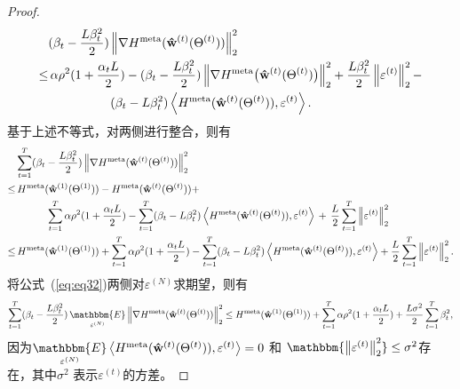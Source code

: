 \begin{proof}
\begin{equation}
\begin{aligned}
        & (\beta_t - \frac{L \beta_t^2}{2}) \left\| \nabla H^{\rm meta}(\mathbf{\hat w}^{(t)}(\Theta^{(t)})) \right\|_2^2  \\
        \leq & \, \alpha \rho^2 (1 + \frac{\alpha_t L}{2}) - (\beta_t - \frac{L \beta_t^2}{2}) \left\| \nabla H^{\rm meta} \big{(} \mathbf{\hat w}^{(t)}(\Theta^{(t)}) \big{)} \right\|_2^2 +  \frac{L \beta_t^2}{2} \left\| \varepsilon^{(t)} \right\|_2^2 - \\ &  \quad\quad\quad\quad\quad(\beta_t - L\beta_t^2) \left\langle H^{\rm meta}(\mathbf{\hat w}^{(t)}(\Theta^{(t)})), \varepsilon^{(t)}  \right\rangle. 
    \end{aligned}
\end{equation}
基于上述不等式，对两侧进行整合，则有
\begin{equation}
    \begin{aligned}
    \label{eq:eq32}
        &  \sum\limits_{t=1}^T (\beta_t - \frac{L \beta_t^2}{2}) \left\| \nabla H^{\rm meta}(\mathbf{\hat w}^{(t)}(\Theta^{(t)})) \right\|_2^2
        \\
        \leq & \, H^{\rm meta}(\mathbf{\hat w}^{(1)}(\Theta^{(1)})) 
        - 
        H^{\rm meta}(\mathbf{\hat w}^{(t)}(\Theta^{(t)}))  + \\
        & \quad \quad \quad \sum\limits_{t=1}^T \alpha \rho^2 (1 + \frac{\alpha_t L}{2}) -
        \sum\limits_{t=1}^T (\beta_t - L\beta_t^2) \left\langle H^{\rm meta}(\mathbf{\hat w}^{(t)}(\Theta^{(t)})), \varepsilon^{(t)}  \right\rangle 
        \, + \,
        \frac{L}{2} \sum\limits_{t=1}^T \left\| \varepsilon^{(t)} \right\|_2^2 \\
        \leq & \, H^{\rm meta}(\mathbf{\hat w}^{(1)}(\Theta^{(1)}))  + \sum\limits_{t=1}^T \alpha \rho^2 (1 + \frac{\alpha_t L}{2}) -
        \sum\limits_{t=1}^T (\beta_t - L\beta_t^2) \left\langle H^{\rm meta}(\mathbf{\hat w}^{(t)}(\Theta^{(t)})), \varepsilon^{(t)}  \right\rangle 
        +
        \frac{L}{2} \sum\limits_{t=1}^T \left\| \varepsilon^{(t)} \right\|_2^2.
    \end{aligned}
\end{equation}
将公式~(\ref{eq:eq32})两侧对$\varepsilon^{(N)}$求期望，则有
\begin{equation}
    \begin{aligned}
 \sum\limits_{t=1}^T (\beta_t - \frac{L \beta_t^2}{2}) \mathop{\mathbbm{E}}\limits_{\varepsilon^{(N)}} \left\| \nabla H^{\rm meta}(\mathbf{\hat w}^{(t)}(\Theta^{(t)})) \right\|_2^2 
        \leq   H^{\rm meta}(\mathbf{\hat w}^{(1)}(\Theta^{(1)})) + \sum\limits_{t=1}^T \alpha \rho^2 (1 + \frac{\alpha_t L}{2}) + \frac{L\sigma^2}{2} \sum\limits_{t=1}^T \beta_t^2,
    \end{aligned}
\end{equation}
因为$\mathop{\mathbbm{E}}\limits_{\varepsilon^{(N)}} \left\langle H^{\rm meta}(\mathbf{\hat w}^{(t)}(\Theta^{(t)})), \varepsilon^{(t)}  \right\rangle=0$ 和 $\mathbbm{\left\| \varepsilon^{(t)} \right\|_2^2} \leq \sigma^2$存在，其中$\sigma^2$ 表示$\varepsilon^{(t)}$的方差。


\end{proof}
